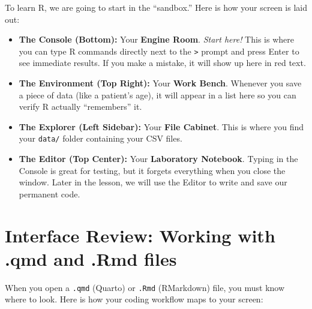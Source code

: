 \documentclass[
  letterpaper,
  DIV=11,
  numbers=noendperiod,
  oneside]{scrreprt}
\providecommand{\tightlist}{%
  \setlength{\itemsep}{0pt}\setlength{\parskip}{0pt}}
\begin{document}
To learn R, we are going to start in the ``sandbox.'' Here is how your
screen is laid out:

\begin{itemize}
\tightlist
\item
  \textbf{The Console (Bottom):} Your \textbf{Engine Room}. \emph{Start
  here!} This is where you can type R commands directly next to the
  \texttt{\textgreater{}} prompt and press Enter to see immediate
  results. If you make a mistake, it will show up here in red text.
\item
  \textbf{The Environment (Top Right):} Your \textbf{Work Bench}.
  Whenever you save a piece of data (like a patient's age), it will
  appear in a list here so you can verify R actually ``remembers'' it.
\item
  \textbf{The Explorer (Left Sidebar):} Your \textbf{File Cabinet}. This
  is where you find your \texttt{data/} folder containing your CSV
  files.
\item
  \textbf{The Editor (Top Center):} Your \textbf{Laboratory Notebook}.
  Typing in the Console is great for testing, but it forgets everything
  when you close the window. Later in the lesson, we will use the Editor
  to write and save our permanent code.
\end{itemize}

\section{Interface Review: Working with .qmd and .Rmd
files}\label{interface-review-working-with-.qmd-and-.rmd-files}

When you open a \texttt{.qmd} (Quarto) or \texttt{.Rmd} (RMarkdown)
file, you must know where to look. Here is how your coding workflow maps
to your screen:
\end{document}
